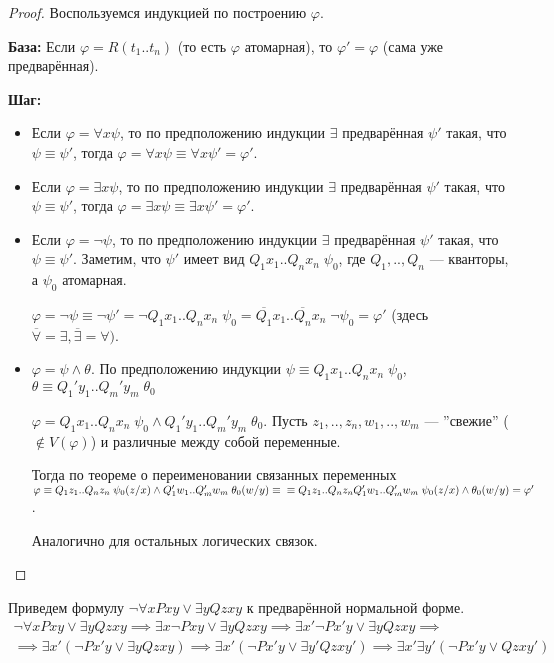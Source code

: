 \documentclass[a4paper, fleqn]{article}
\begin{document}
    \begin{proof}
        Воспользуемся индукцией по построению $\varphi$.

        \textbf{База: } Если $\varphi = R(t_1..t_n)$ (то есть $\varphi$ атомарная), то $\varphi' = \varphi$ (сама уже предварённая).

        \textbf{Шаг:}
        \begin{itemize}
        \item Если $\varphi = \forall x \psi$, то по предположению индукции $\exists$ предварённая $\psi'$ такая, что $\psi \equiv \psi'$, тогда $\varphi = \forall x \psi \equiv \forall x \psi' = \varphi'$.
        \item Если $\varphi = \exists x \psi$, то по предположению индукции $\exists$ предварённая $\psi'$ такая, что $\psi \equiv \psi'$, тогда $\varphi = \exists x \psi \equiv \exists x \psi' = \varphi'$.
        \item Если $\varphi = \neg \psi$, то по предположению индукции $\exists$ предварённая $\psi'$ такая, что $\psi \equiv \psi'$. Заметим, что $\psi'$ имеет вид $Q_1x_1..Q_nx_n \; \psi_0$, где $Q_1,..,Q_n$ --- кванторы, а $\psi_0$ атомарная.

        $\varphi = \neg \psi \equiv \neg \psi' = \neg Q_1x_1..Q_nx_n \; \psi_0 = \overline{Q_1}x_1..\overline{Q_n}x_n \; \neg \psi_0 = \varphi'$ (здесь $\overline{\forall} = \exists, \overline{\exists} = \forall)$.
        \item $\varphi = \psi \wedge \theta$. По предположению индукции $\psi \equiv Q_1x_1..Q_nx_n \; \psi_0$, $\theta \equiv Q_1'y_1..Q_m'y_m \; \theta_0$

        $\varphi = Q_1x_1..Q_nx_n \; \psi_0 \wedge Q_1'y_1..Q_m'y_m \; \theta_0$. Пусть $z_1, .., z_n, w_1, .., w_m$ --- ''свежие''{} ($\notin V(\varphi)$) и различные между собой переменные.

        Тогда по теореме о переименовании связанных переменных $\varphi \equiv  Q_1z_1..Q_nz_n \; \psi_0(z/x) \wedge Q_1'w_1..Q_m'w_m \; \theta_0(w/y) \equiv \\ \equiv Q_1z_1..Q_nz_n Q_1'w_1..Q_m'w_m \; \psi_0(z/x) \wedge \theta_0(w/y) = \varphi'$.

        Аналогично для остальных логических связок.
        \end{itemize}
    \end{proof}

    \begin{example}
        Приведем формулу $\neg \forall x Pxy \vee \exists y Qzxy$ к предварённой нормальной форме.
        \begin{gather*}
            \neg \forall x Pxy \vee \exists y Qzxy \implies \exists x \neg Pxy \vee \exists y Qzxy \implies \exists x' \neg Px'y \vee \exists y Qzxy \implies \\ \implies \exists x' (\neg Px'y \vee \exists y Qzxy) \implies \exists x' (\neg Px'y \vee \exists y' Qzxy') \implies \exists x' \exists y' (\neg Px'y \vee Qzxy')
        \end{gather*}
    \end{example}
\end{document}
